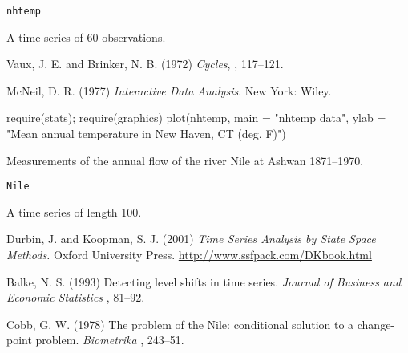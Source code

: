 %
\begin{Usage}
\begin{verbatim}
nhtemp
\end{verbatim}
\end{Usage}
%
\begin{Format}
A time series of 60 observations.
\end{Format}
%
\begin{Source}\relax
Vaux, J. E. and Brinker, N. B. (1972)
\emph{Cycles}, , 117--121.
\end{Source}
%
\begin{References}\relax
McNeil, D. R. (1977)
\emph{Interactive Data Analysis}.
New York: Wiley.
\end{References}
%
\begin{Examples}
\begin{ExampleCode}
require(stats); require(graphics)
plot(nhtemp, main = "nhtemp data",
  ylab = "Mean annual temperature in New Haven, CT (deg. F)")
\end{ExampleCode}
\end{Examples}
%
\begin{Description}\relax
Measurements of the annual flow of the river Nile at Ashwan 1871--1970.
\end{Description}
%
\begin{Usage}
\begin{verbatim}
Nile
\end{verbatim}
\end{Usage}
%
\begin{Format}
A time series of length 100.
\end{Format}
%
\begin{Source}\relax
Durbin, J. and Koopman, S. J. (2001) \emph{Time Series Analysis by
State Space Methods.}  Oxford University Press.
\url{http://www.ssfpack.com/DKbook.html}
\end{Source}
%
\begin{References}\relax
Balke, N. S. (1993) Detecting level shifts in time series.
\emph{Journal of Business and Economic Statistics} , 81--92.

Cobb, G. W. (1978) The problem of the Nile: conditional solution to a
change-point problem.  \emph{Biometrika} , 243--51.
\end{References}
%
